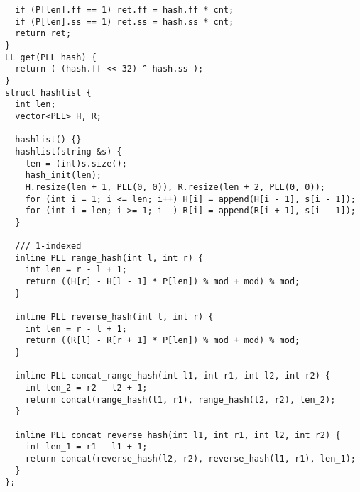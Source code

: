 \documentclass[FSZ,a4paper,onesided]{article}
\begin{document}
\begin{multicols*}{\COLS}
\begin{lstlisting}
  if (P[len].ff == 1) ret.ff = hash.ff * cnt;
  if (P[len].ss == 1) ret.ss = hash.ss * cnt;
  return ret;
}
LL get(PLL hash) {
  return ( (hash.ff << 32) ^ hash.ss );
}
struct hashlist {
  int len;
  vector<PLL> H, R;

  hashlist() {}
  hashlist(string &s) {
    len = (int)s.size();
    hash_init(len);
    H.resize(len + 1, PLL(0, 0)), R.resize(len + 2, PLL(0, 0));
    for (int i = 1; i <= len; i++) H[i] = append(H[i - 1], s[i - 1]);
    for (int i = len; i >= 1; i--) R[i] = append(R[i + 1], s[i - 1]);
  }
  
  /// 1-indexed
  inline PLL range_hash(int l, int r) {
    int len = r - l + 1;
    return ((H[r] - H[l - 1] * P[len]) % mod + mod) % mod;
  }

  inline PLL reverse_hash(int l, int r) {
    int len = r - l + 1;
    return ((R[l] - R[r + 1] * P[len]) % mod + mod) % mod;
  }

  inline PLL concat_range_hash(int l1, int r1, int l2, int r2) {
    int len_2 = r2 - l2 + 1;
    return concat(range_hash(l1, r1), range_hash(l2, r2), len_2);
  }

  inline PLL concat_reverse_hash(int l1, int r1, int l2, int r2) {
    int len_1 = r1 - l1 + 1;
    return concat(reverse_hash(l2, r2), reverse_hash(l1, r1), len_1);
  }
};\end{lstlisting}
\end{multicols*}

\end{document}
